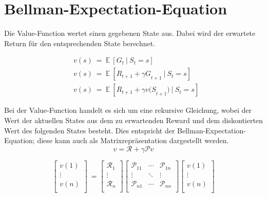 \section{Bellman-Expectation-Equation}
Die Value-Function wertet einen gegebenen State aus. Dabei wird der erwartete Return für den entsprechenden State berechnet. 




\begin{align}
&v(s)\ =\ \mathbb{E}\ [G_t\ |{\ S}_t=s] \nonumber\\
&v(s)\ =\ \mathbb{E}\ [R_{t+1}+{\gamma G}_{t+1}\ |{\ S}_t=s] \nonumber\\
&v(s)\ =\ \mathbb{E}\ [R_{t+1}+{\gamma v(S}_{t+1})\ |{\ S}_t=s] \label{bellman-exp-equa}
\end{align}


Bei der Value-Function handelt es sich um eine rekursive Gleichung, wobei der Wert der aktuellen States aus dem zu erwartenden Reward und dem diskontierten Wert des folgenden States besteht. Dies entspricht der Bellman-Expectation-Equation; diese kann auch als Matrixrepräsentation dargestellt werden.
\begin{equation}
  v=\mathcal{R}+\gamma\mathcal{P}v
\end{equation}

\begin{equation}
\left[\begin{matrix}v(1)\\\vdots\\v(n)\\\end{matrix}\right]\ =\left[\begin{matrix}\mathcal{R}_1\\\vdots\\\mathcal{R}_n\\\end{matrix}\right]\left[\begin{matrix}\mathcal{P}_{11}&\cdots&\mathcal{P}_{1n}\\\vdots&\ddots&\vdots\\\mathcal{P}_{n1}&\cdots&\mathcal{P}_{nn}\\\end{matrix}\right]\left[\begin{matrix}v(1)\\\vdots\\v(n)\\\end{matrix}\right]
\end{equation}


